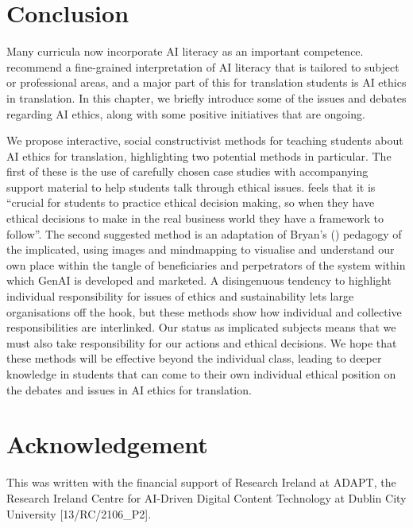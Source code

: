 \documentclass[output=paper]{langscibook}
\begin{document}
\section{Conclusion}
Many curricula now incorporate AI literacy as an important competence. \citet{chan_generative_2024} recommend a fine-grained interpretation of AI literacy that is tailored to subject or professional areas, and a major part of this for translation students is AI ethics in translation. In this chapter, we briefly introduce some of the issues and debates regarding AI ethics, along with some positive initiatives that are ongoing. 

We propose interactive, social constructivist methods for teaching students about AI ethics for translation, highlighting two potential methods in particular. The first of these is the use of carefully chosen case studies with accompanying support material to help students talk through ethical issues. \citet[21]{benbunan-fich_guidelines_1998} feels that it is “crucial for students to practice ethical decision making, so when they have ethical decisions to make in the real business world they have a framework to follow”. The second suggested method is an adaptation of Bryan's (\citeyear{bryan_pedagogy_2022}) pedagogy of the implicated, using images and mindmapping to visualise and understand our own place within the tangle of beneficiaries and perpetrators of the system within which GenAI is developed and marketed. A disingenuous tendency to highlight individual responsibility for issues of ethics and sustainability lets large organisations off the hook, but these methods show how individual and collective responsibilities are interlinked. Our status as implicated subjects means that we must also take responsibility for our actions and ethical decisions. We hope that these methods will be effective beyond the individual class, leading to deeper knowledge in students that can come to their own individual ethical position on the debates and issues in AI ethics for translation.

\section*{Acknowledgement}This was written with the financial support of Research Ireland at ADAPT, the
Research Ireland Centre for AI-Driven Digital Content Technology at Dublin City University
[13/RC/2106\_P2].

\sloppy\printbibliography[heading=subbibliography,notkeyword=this]
\end{document}
